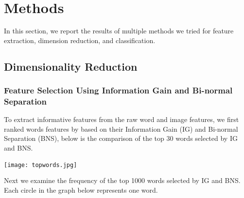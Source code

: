 \section{Methods}
In this section, we report the results of multiple methods we tried for feature extraction, dimension reduction, and classification. 


\subsection{Dimensionality Reduction}
\subsubsection{Feature Selection Using Information Gain and Bi-normal Separation}
To extract informative features from the raw word and image features,  we first ranked words features by based on their Information Gain (IG) and Bi-normal Separation (BNS), below is the comparison of the top 30 words selected by IG and BNS.   
\begin{center}
\texttt{[image: topwords.jpg]}
\end{center}
Next we examine the frequency of the top 1000 words selected by IG and BNS. Each circle in the graph below represents one word.
\begin{center}
\end{center}
